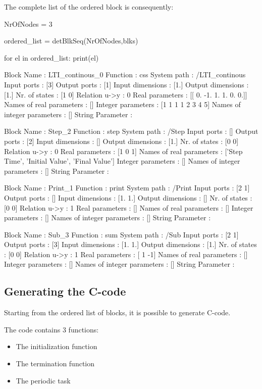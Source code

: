 The complete list of the ordered block is consequently:

\begin{code}
NrOfNodes = 3

ordered_list = detBlkSeq(NrOfNodes,blks)

for el in ordered_list:
    print(el)

Block Name         : LTI_continous_0
Function           : css
System path        : /LTI_continous
Input ports        : [3]
Output ports      : [1]
Input dimensions : [1.]
Output dimensions : [1.]
Nr. of states      : [1 0]
Relation u->y      : 0
Real parameters    : [[ 0. -1.  1.  1.  0.  0.]]
Names of real parameters : []
Integer parameters : [1 1 1 1 2 3 4 5]
Names of integer parameters : []
String Parameter   :

Block Name         : Step_2
Function           : step
System path        : /Step
Input ports        : []
Output ports      : [2]
Input dimensions : []
Output dimensions : [1.]
Nr. of states      : [0 0]
Relation u->y      : 0
Real parameters    : [1 0 1]
Names of real parameters : ['Step Time', 'Initial Value', 'Final Value']
Integer parameters : []
Names of integer parameters : []
String Parameter   :

Block Name         : Print_1
Function           : print
System path        : /Print
Input ports        : [2 1]
Output ports      : []
Input dimensions : [1. 1.]
Output dimensions : []
Nr. of states      : [0 0]
Relation u->y      : 1
Real parameters    : []
Names of real parameters : []
Integer parameters : []
Names of integer parameters : []
String Parameter   :

Block Name         : Sub_3
Function           : sum
System path        : /Sub
Input ports        : [2 1]
Output ports      : [3]
Input dimensions : [1. 1.]
Output dimensions : [1.]
Nr. of states      : [0 0]
Relation u->y      : 1
Real parameters    : [ 1 -1]
Names of real parameters : []
Integer parameters : []
Names of integer parameters : []
String Parameter   :
\end{code}

\subsection{Generating the C-code}
Starting from the ordered list of blocks, it is possible to generate 
C-code.

The code contains 3 functions:

\begin{itemize}
\item The initialization function
\item The termination function
\item The periodic task
\end{itemize}

